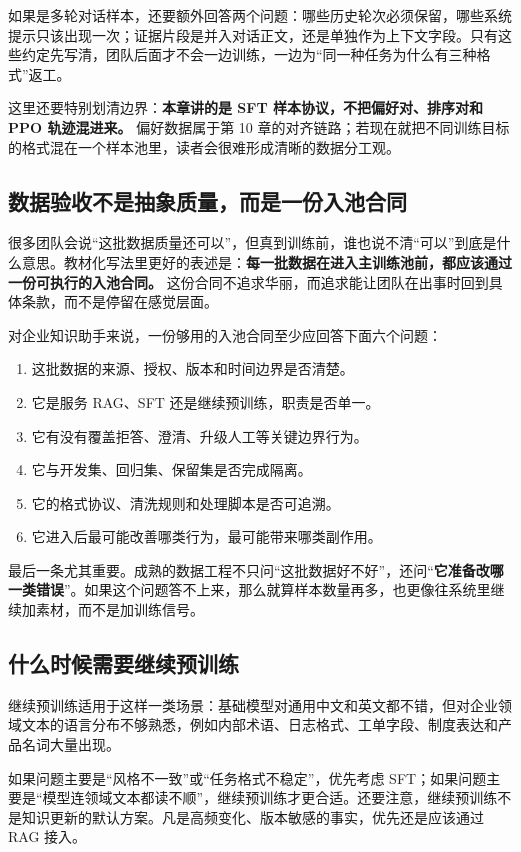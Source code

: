 如果是多轮对话样本，还要额外回答两个问题：哪些历史轮次必须保留，哪些系统提示只该出现一次；证据片段是并入对话正文，还是单独作为上下文字段。只有这些约定先写清，团队后面才不会一边训练，一边为“同一种任务为什么有三种格式”返工。

这里还要特别划清边界：\textbf{本章讲的是 SFT 样本协议，不把偏好对、排序对和 PPO 轨迹混进来。} 偏好数据属于第 10 章的对齐链路；若现在就把不同训练目标的格式混在一个样本池里，读者会很难形成清晰的数据分工观。

\subsection{数据验收不是抽象质量，而是一份入池合同}
很多团队会说“这批数据质量还可以”，但真到训练前，谁也说不清“可以”到底是什么意思。教材化写法里更好的表述是：\textbf{每一批数据在进入主训练池前，都应该通过一份可执行的入池合同。} 这份合同不追求华丽，而追求能让团队在出事时回到具体条款，而不是停留在感觉层面。

对企业知识助手来说，一份够用的入池合同至少应回答下面六个问题：
\begin{enumerate}
  \item 这批数据的来源、授权、版本和时间边界是否清楚。
  \item 它是服务 RAG、SFT 还是继续预训练，职责是否单一。
  \item 它有没有覆盖拒答、澄清、升级人工等关键边界行为。
  \item 它与开发集、回归集、保留集是否完成隔离。
  \item 它的格式协议、清洗规则和处理脚本是否可追溯。
  \item 它进入后最可能改善哪类行为，最可能带来哪类副作用。
\end{enumerate}

最后一条尤其重要。成熟的数据工程不只问“这批数据好不好”，还问“\textbf{它准备改哪一类错误}”。如果这个问题答不上来，那么就算样本数量再多，也更像往系统里继续加素材，而不是加训练信号。

\subsection{什么时候需要继续预训练}
继续预训练适用于这样一类场景：基础模型对通用中文和英文都不错，但对企业领域文本的语言分布不够熟悉，例如内部术语、日志格式、工单字段、制度表达和产品名词大量出现。

如果问题主要是“风格不一致”或“任务格式不稳定”，优先考虑 SFT；如果问题主要是“模型连领域文本都读不顺”，继续预训练才更合适。还要注意，继续预训练不是知识更新的默认方案。凡是高频变化、版本敏感的事实，优先还是应该通过 RAG 接入。

